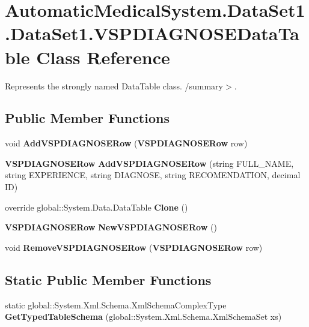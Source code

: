 \section{AutomaticMedicalSystem.DataSet1.DataSet1.VSPDIAGNOSEDataTable Class Reference}
\label{class_automatic_medical_system_1_1_data_set1_1_1_v_s_p_d_i_a_g_n_o_s_e_data_table}
Represents the strongly named DataTable class. /summary$>$.  


\subsection*{Public Member Functions}
\begin{CompactItemize}
\item 
void \textbf{AddVSPDIAGNOSERow} ({\bf VSPDIAGNOSERow} row)\label{class_automatic_medical_system_1_1_data_set1_1_1_v_s_p_d_i_a_g_n_o_s_e_data_table_26bad83ea2cb1360cee716649078c470}

\item 
{\bf VSPDIAGNOSERow} \textbf{AddVSPDIAGNOSERow} (string FULL\_\-NAME, string EXPERIENCE, string DIAGNOSE, string RECOMENDATION, decimal ID)\label{class_automatic_medical_system_1_1_data_set1_1_1_v_s_p_d_i_a_g_n_o_s_e_data_table_d8329a4ebd122e92852f11ed3c622f64}

\item 
override global::System.Data.DataTable \textbf{Clone} ()\label{class_automatic_medical_system_1_1_data_set1_1_1_v_s_p_d_i_a_g_n_o_s_e_data_table_9502f621eb55b005496714092a57212f}

\item 
{\bf VSPDIAGNOSERow} \textbf{NewVSPDIAGNOSERow} ()\label{class_automatic_medical_system_1_1_data_set1_1_1_v_s_p_d_i_a_g_n_o_s_e_data_table_d467b095d2dd1675e29158af1d244488}

\item 
void \textbf{RemoveVSPDIAGNOSERow} ({\bf VSPDIAGNOSERow} row)\label{class_automatic_medical_system_1_1_data_set1_1_1_v_s_p_d_i_a_g_n_o_s_e_data_table_e9a3ab907d83562df2c7fdf96405cccc}

\end{CompactItemize}
\subsection*{Static Public Member Functions}
\begin{CompactItemize}
\item 
static global::System.Xml.Schema.XmlSchemaComplexType \textbf{GetTypedTableSchema} (global::System.Xml.Schema.XmlSchemaSet xs)\label{class_automatic_medical_system_1_1_data_set1_1_1_v_s_p_d_i_a_g_n_o_s_e_data_table_40b63ce5533b1706d740c5acf137c0f4}

\end{CompactItemize}
